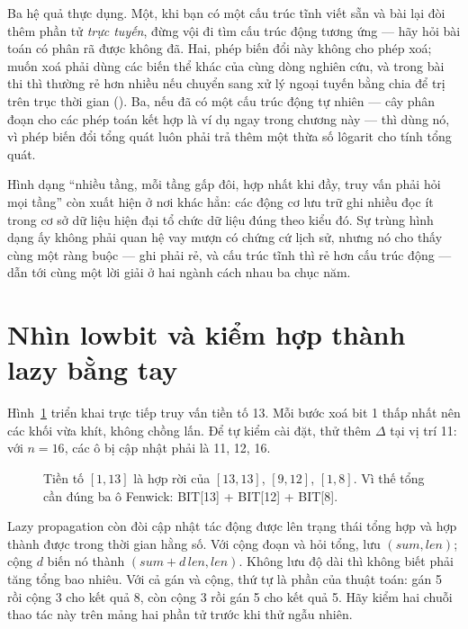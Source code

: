 \documentclass[../../algorithm.tex]{subfiles}
\begin{document}
Ba hệ quả thực dụng. Một, khi bạn có một cấu trúc tĩnh viết sẵn và bài lại đòi thêm phần tử \emph{trực tuyến}, đừng vội đi tìm cấu trúc động tương ứng --- hãy hỏi bài toán có phân rã được không đã. Hai, phép biến đổi này không cho phép xoá; muốn xoá phải dùng các biến thể khác của cùng dòng nghiên cứu, và trong bài thi thì thường rẻ hơn nhiều nếu chuyển sang xử lý ngoại tuyến bằng chia để trị trên trục thời gian (). Ba, nếu đã có một cấu trúc động tự nhiên --- cây phân đoạn cho các phép toán kết hợp là ví dụ ngay trong chương này --- thì dùng nó, vì phép biến đổi tổng quát luôn phải trả thêm một thừa số lôgarit cho tính tổng quát.

Hình dạng ``nhiều tầng, mỗi tầng gấp đôi, hợp nhất khi đầy, truy vấn phải hỏi mọi tầng'' còn xuất hiện ở nơi khác hẳn: các động cơ lưu trữ ghi nhiều đọc ít trong cơ sở dữ liệu hiện đại tổ chức dữ liệu đúng theo kiểu đó. Sự trùng hình dạng ấy không phải quan hệ vay mượn có chứng cứ lịch sử, nhưng nó cho thấy cùng một ràng buộc --- ghi phải rẻ, và cấu trúc tĩnh thì rẻ hơn cấu trúc động --- dẫn tới cùng một lời giải ở hai ngành cách nhau ba chục năm.

\section{Nhìn lowbit và kiểm hợp thành lazy bằng tay}

Hình~\ref{fig:review-fenwick} triển khai trực tiếp truy vấn tiền tố 13. Mỗi bước xoá bit 1 thấp nhất nên các khối vừa khít, không chồng lấn.
Để tự kiểm cài đặt, thử thêm \(\Delta\) tại vị trí 11: với \(n=16\), các ô bị cập nhật phải là 11, 12, 16.

\begin{figure}[H]\centering
{}
\caption{Tiền tố \([1,13]\) là hợp rời của \([13,13]\), \([9,12]\), \([1,8]\). Vì thế tổng cần đúng ba ô Fenwick: BIT[13] + BIT[12] + BIT[8].}
\label{fig:review-fenwick}
\end{figure}

Lazy propagation còn đòi cập nhật tác động được lên trạng thái tổng hợp và hợp thành được trong thời gian hằng số\cite{aclLazy}.
Với cộng đoạn và hỏi tổng, lưu \((sum,len)\); cộng \(d\) biến nó thành \((sum+d\,len,len)\).
Không lưu độ dài thì không biết phải tăng tổng bao nhiêu. Với cả gán và cộng, thứ tự là phần của thuật toán:
gán 5 rồi cộng 3 cho kết quả 8, còn cộng 3 rồi gán 5 cho kết quả 5.
Hãy kiểm hai chuỗi thao tác này trên mảng hai phần tử trước khi thử ngẫu nhiên.
\end{document}
